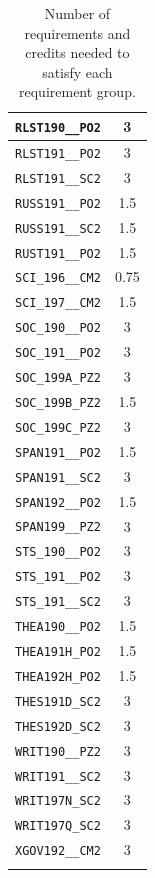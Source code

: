 \begin{longtable}{|p{}|c|}
    \verb|RLST190__PO2| & 3\\\hline
    \verb|RLST191__PO2| & 3\\\hline
    \verb|RLST191__SC2| & 3\\\hline
    \verb|RUSS191__PO2| & 1.5\\\hline
    \verb|RUSS191__SC2| & 1.5\\\hline
    \verb|RUST191__PO2| & 1.5\\\hline
    \verb|SCI_196__CM2| & 0.75\\\hline
    \verb|SCI_197__CM2| & 1.5\\\hline
    \verb|SOC_190__PO2| & 3\\\hline
    \verb|SOC_191__PO2| & 3\\\hline
    \verb|SOC_199A_PZ2| & 3\\\hline
    \verb|SOC_199B_PZ2| & 1.5\\\hline
    \verb|SOC_199C_PZ2| & 3\\\hline
    \verb|SPAN191__PO2| & 1.5\\\hline
    \verb|SPAN191__SC2| & 3\\\hline
    \verb|SPAN192__PO2| & 1.5\\\hline
    \verb|SPAN199__PZ2| & 3\\\hline
    \verb|STS_190__PO2| & 3\\\hline
    \verb|STS_191__PO2| & 3\\\hline
    \verb|STS_191__SC2| & 3\\\hline
    \verb|THEA190__PO2| & 1.5\\\hline
    \verb|THEA191H_PO2| & 1.5\\\hline
    \verb|THEA192H_PO2| & 1.5\\\hline
    \verb|THES191D_SC2| & 3\\\hline
    \verb|THES192D_SC2| & 3\\\hline
    \verb|WRIT190__PZ2| & 3\\\hline
    \verb|WRIT191__SC2| & 3\\\hline
    \verb|WRIT197N_SC2| & 3\\\hline
    \verb|WRIT197Q_SC2| & 3\\\hline
    \verb|XGOV192__CM2| & 3\\\hline
    \caption{Number of requirements and credits needed to satisfy each requirement group.}
    \label{tab:reqs-nums}
\end{longtable}
